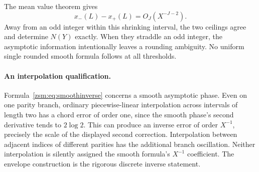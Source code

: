 \documentclass[11pt]{article}
\theoremstyle{definition}\newtheorem{definition}[theorem]{Definition}
\theoremstyle{remark}\newtheorem{remark}[theorem]{Remark}
\begin{document}
The mean value theorem gives
\[
 x_-(L)-x_+(L)=O_J(X^{-J-2}).
\]
Away from an odd integer within this shrinking interval, the two ceilings
agree and determine $N(Y)$ exactly. When they straddle an odd integer, the
asymptotic information intentionally leaves a rounding ambiguity. No uniform
single rounded smooth formula follows at all thresholds.

\paragraph{An interpolation qualification.}
Formula~\eqref{zsm:eq:smoothinverse} concerns a smooth asymptotic phase. Even on
one parity branch, ordinary piecewise-linear interpolation across intervals
of length two has a chord error of order one, since the smooth phase's second
derivative tends to $2\log2$. This can produce an inverse error of order
$X^{-1}$, precisely the scale of the displayed second correction. Interpolation
between adjacent indices of different parities has the additional branch
oscillation. Neither interpolation is silently assigned the smooth formula's
$X^{-1}$ coefficient. The envelope construction is the rigorous discrete
inverse statement.
\end{document}
